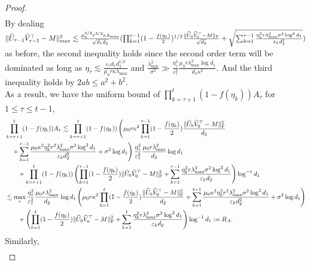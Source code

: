\documentclass[12pt]{article}
\newcommand\fro[1]{\| #1 \|_{\rm{F}}}
\theoremstyle{plain}
\begin{document}
\begin{proof}
\begin{align*}
    \end{align*}
    By dealing $\|\widehat{U}_{\tau-1}\widehat{V}_{\tau-1}^{\top}-M\|_{\max}^2\lesssim \frac{\mu_0^{3/2}r^{3/2}\kappa \lambda_{\max}}{\sqrt{d_1d_2}}(\prod_{k=1}^{\tau-1} (1-\frac{f(\eta_k)}{2})^{1/2}\frac{\fro{\widehat{U}_0\widehat{V}_0^{\top}-M}}{\sqrt{d_2}} + \sqrt{\sum_{k=1}^{\tau-1}\frac{\eta_k^2r\lambda_{\max}^2\sigma^2\log^2d_1}{\varepsilon_k d_2^2}})$ as before, the second inequality holds since the second order term will be dominated as long as $\eta_\tau\lesssim \frac{\varepsilon_\tau d_1d_2^{1/2}}{\mu_0 r \kappa \lambda_{\max}}$ and $\frac{\lambda_{\min}^2}{\sigma^2}\gg \frac{\eta_{\tau}^2}{\varepsilon_{\tau}^2}\frac{\mu_0 r \lambda_{\max}^2\log d_1}{d_1\kappa^2}$. And the third inequality holds by $2ab\leq a^2+b^2$.  \\
    As a result, we have the uniform bound of $\prod_{k=\tau+1}^{t} (1-f(\eta_k))A_{\tau}$ for $1\leq \tau\leq t-1$, 
    \begin{align*}
        &\prod_{k=\tau+1}^{t} (1-f(\eta_k))A_{\tau}\lesssim \prod_{k=\tau+1}^{t} (1-f(\eta_k))\left(\mu_0r\kappa^2 \prod_{k=1}^{\tau-1} (1-\frac{f(\eta_k)}{2})\frac{\fro{\widehat{U}_0\widehat{V}_0^{\top}-M}^2}{d_2} \right.\\ &\left.\quad + \sum_{k=1}^{\tau-1}\frac{\mu_0\kappa^2 \eta_k^2r^2\lambda_{\max}^2\sigma^2\log^2d_1}{\varepsilon_k d_2^2}  + \sigma^2\log d_1 \right) \frac{\eta_\tau^2}{\varepsilon_\tau^2}\frac{\mu_0r\lambda_{\max}^2}{d_2}\log d_1 \\ &\quad\quad + \prod_{k=\tau+1}^{t} (1-f(\eta_k))\left(\prod_{k=1}^{\tau-1}(1-\frac{f(\eta_{k})}{2}) \fro{\widehat{U}_0\widehat{V}_0^{\top} - M}^2 + \sum_{k=1}^{\tau-1}\frac{\eta_k^2r\lambda_{\max}^2\sigma^2\log^2 d_1}{\varepsilon_kd_2}\right)\log^{-1}d_1 \\
        &\lesssim  \max_{\tau}\frac{\eta_{\tau}^2}{\varepsilon_{\tau}^2}\frac{\mu_0r\lambda_{\max}^2}{d_2}\log d_1 \left(\mu_0r\kappa^2 \prod_{k=1}^{t}(1-\frac{f(\eta_{k})}{2}) \frac{\fro{\widehat{U}_0\widehat{V}_0^{\top} - M}^2}{d_2} + \sum_{k=1}^{t-1}\frac{\mu_0\kappa^2 \eta_k^2r^2\lambda_{\max}^2\sigma^2\log^2 d_1}{\varepsilon_k d_2^2} + \sigma^2\log d_1\right)  \\ &\quad\quad + \left(\prod_{k=1}^{t}(1-\frac{f(\eta_{k})}{2}) \fro{\widehat{U}_0\widehat{V}_0^{\top} - M}^2 + \sum_{k=1}^{t}\frac{\eta_k^2r\lambda_{\max}^2\sigma^2\log^2 d_1}{\varepsilon_kd_2}\right)\log^{-1}d_1:=R_{A}.
    \end{align*}
    Similarly,
    \begin{align*}

\end{align*}
\end{proof}
\end{document}
